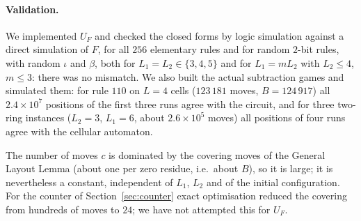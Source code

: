 \paragraph{Validation.}  We implemented $U_F$ and checked the closed forms by logic simulation
against a direct simulation of $F$, for all $256$ elementary rules and for random $2$-bit rules,
with random $\iota$ and $\beta$, both for $L_1=L_2\in\{3,4,5\}$ and for $L_1=mL_2$ with $L_2\le4$,
$m\le3$: there was no mismatch.  We also built the
actual subtraction games and simulated them: for rule $110$ on $L=4$ cells ($123\,181$ moves, $B=124\,917$)
all $2.4\times10^7$ positions of the first three runs agree with the circuit, and for three
two-ring instances ($L_2=3$, $L_1=6$, about $2.6\times10^5$ moves) all positions of four runs agree with
the cellular automaton.

\begin{remark}
The number of moves $c$ is dominated by the covering moves of the General Layout Lemma (about one per
zero residue, i.e.\ about $B$), so it is large; it is nevertheless a constant, independent of $L_1$,
$L_2$ and of the initial configuration.  For the counter of Section~\ref{sec:counter} exact optimisation
reduced the covering from hundreds of moves to $24$; we have not attempted this for $U_F$.
\end{remark}

